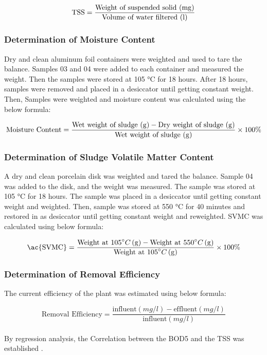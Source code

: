 \begin{equation}
    \text{TSS} = \dfrac{\text{Weight of suspended solid (\unit{mg})}}{\text{Volume of water filtered (\unit{l})}}
\end{equation}

\subsubsection{Determination of Moisture Content}
Dry and clean aluminum foil containers were weighted and used to tare the balance. Samples 03 and 04 were added to each container and measured the weight. Then the samples were stored at 105 °C for 18 hours. After 18 hours, samples were removed and placed in a desiccator until getting constant weight. Then, Samples were weighted and moisture content was calculated using the below formula:

\begin{equation}
    \text{Moisture Content} = \dfrac{\text{Wet weight of sludge (\unit{g})} - \text{Dry weight of sludge (\unit{g})}}{\text{Wet weight of sludge (\unit{g})}} \times 100\%
\end{equation}

\subsubsection{Determination of Sludge Volatile  Matter Content}
A dry and clean porcelain disk was weighted and tared the balance. Sample 04 was added to the disk, and the weight was measured. The sample was stored at 105 °C for 18 hours. The sample was placed in a desiccator until getting constant weight and weighted. Then, sample was stored at 550 °C for 40 minutes and restored in as desiccator until getting constant weight and reweighted. \ac{SVMC} was calculated using below formula:

\begin{equation}
    \text{\ac{SVMC}} = \dfrac{\text{Weight at 105} ^\circ C \left( \unit{g} \right) - \text{Weight at 550} ^\circ C\left( \unit{g} \right) } {\text{Weight at 105} ^\circ C  \left( \unit{g} \right)}\times 100\%
\end{equation}

\subsubsection{Determination of Removal Efficiency}
The current efficiency of the plant was estimated using below formula:

\begin{equation}
    \text{Removal Efficiency} = \dfrac{\text{influent} \left( \unit{mg/l} \right) - \text{effluent} \left( \unit{mg/l} \right) }{\text{influent} \left( \unit{mg/l} \right)}
\end{equation}
\\

By regression analysis, the Correlation between the \ac{BOD5} and the \ac{TSS} was established \cite{Kumar2010}.

 